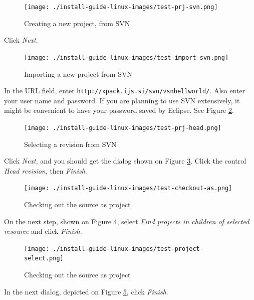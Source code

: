 \documentclass[a4paper, 10pt]{article}
\begin{document}
    \begin{figure}[H]
    \centering
        \texttt{[image: ./install-guide-linux-images/test-prj-svn.png]}
        \caption{Creating a new project, from SVN}
        \label{fig:test-prj-svn}
    \end{figure}

Click \emph{Next}.

    \begin{figure}[H]
    \centering
        \texttt{[image: ./install-guide-linux-images/test-import-svn.png]}
        \caption{Importing a new project from SVN}
        \label{fig:test-import-svn}
    \end{figure}

In the URL field, enter
\verb+http://xpack.ijs.si/svn/vsnhellworld/+.
Also enter your user name and password.
If you are planning to use SVN extensively, it might be convenient to have your
password saved by Eclipse.
See Figure \ref{fig:test-import-svn}.

    \begin{figure}[H]
    \centering
        \texttt{[image: ./install-guide-linux-images/test-prj-head.png]}
        \caption{Selecting a revision from SVN}
        \label{fig:test-prj-head}
    \end{figure}

Click \emph{Next}, and you should get the dialog shown on
Figure \ref{fig:test-prj-head}.
Click the control \emph{Head revision}, then \emph{Finish}.

    \begin{figure}[H]
    \centering
        \texttt{[image: ./install-guide-linux-images/test-checkout-as.png]}
        \caption{Checking out the source as project}
        \label{fig:test-checkout-as}
    \end{figure}

On the next step, shown on Figure \ref{fig:test-checkout-as}, select
\emph{Find projects in children of selected resource} and click \emph{Finish}.

    \begin{figure}[H]
    \centering
        \texttt{[image: ./install-guide-linux-images/test-project-select.png]}
        \caption{Checking out the source as project}
        \label{fig:test-project-select}
    \end{figure}

In the next dialog, depicted on
Figure \ref{fig:test-project-select},
click \emph{Finish}.
\end{document}
